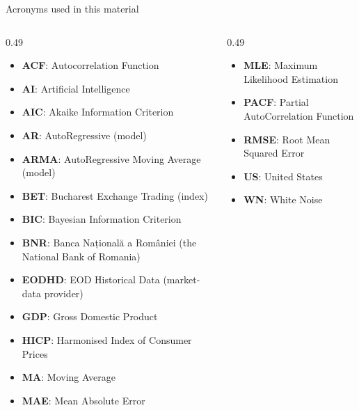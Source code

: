 {
\begin{frame}[noframenumbering]
    \titlepage
\end{frame}
}
\begin{frame}{Acronyms used in this material}
\begin{columns}[T]
\begin{column}{0.49\textwidth}
\begin{itemize}\setlength{\itemsep}{0pt}
    \item \textbf{ACF}: Autocorrelation Function
    \item \textbf{AI}: Artificial Intelligence
    \item \textbf{AIC}: Akaike Information Criterion
    \item \textbf{AR}: AutoRegressive (model)
    \item \textbf{ARMA}: AutoRegressive Moving Average (model)
    \item \textbf{BET}: Bucharest Exchange Trading (index)
    \item \textbf{BIC}: Bayesian Information Criterion
    \item \textbf{BNR}: Banca Națională a României (the National Bank of Romania)
    \item \textbf{EODHD}: EOD Historical Data (market-data provider)
    \item \textbf{GDP}: Gross Domestic Product
    \item \textbf{HICP}: Harmonised Index of Consumer Prices
    \item \textbf{MA}: Moving Average
    \item \textbf{MAE}: Mean Absolute Error
\end{itemize}
\end{column}
\begin{column}{0.49\textwidth}
\begin{itemize}\setlength{\itemsep}{0pt}
    \item \textbf{MLE}: Maximum Likelihood Estimation
    \item \textbf{PACF}: Partial AutoCorrelation Function
    \item \textbf{RMSE}: Root Mean Squared Error
    \item \textbf{US}: United States
    \item \textbf{WN}: White Noise
\end{itemize}
\end{column}
\end{columns}
\end{frame}

